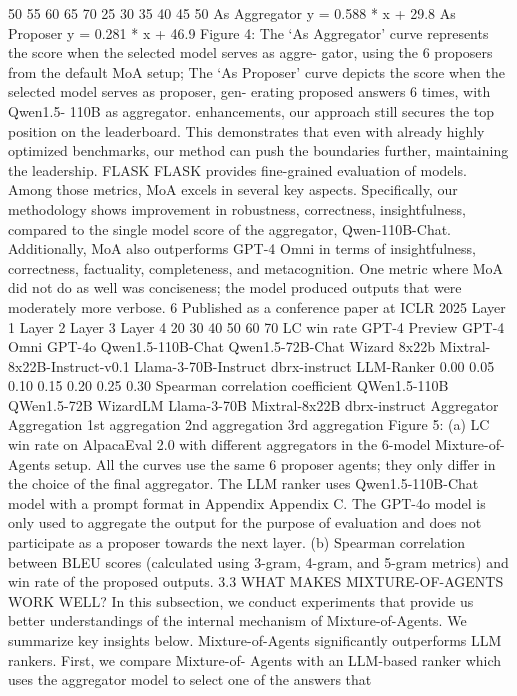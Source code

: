 50
55
60
65
70
25
30
35
40
45
50
As Aggregator
y = 0.588 * x + 29.8
As Proposer
y = 0.281 * x + 46.9
Figure 4: The ‘As Aggregator’ curve represents
the score when the selected model serves as aggre-
gator, using the 6 proposers from the default MoA
setup; The ‘As Proposer’ curve depicts the score
when the selected model serves as proposer, gen-
erating proposed answers 6 times, with Qwen1.5-
110B as aggregator.
enhancements, our approach still secures the top position on the leaderboard. This demonstrates
that even with already highly optimized benchmarks, our method can push the boundaries further,
maintaining the leadership.
FLASK
FLASK provides fine-grained evaluation of models. Among those metrics, MoA excels in
several key aspects. Specifically, our methodology shows improvement in robustness, correctness,
insightfulness, compared to the single model score of the aggregator, Qwen-110B-Chat. Additionally,
MoA also outperforms GPT-4 Omni in terms of insightfulness, correctness, factuality, completeness,
and metacognition. One metric where MoA did not do as well was conciseness; the model produced
outputs that were moderately more verbose.
6
Published as a conference paper at ICLR 2025
Layer 1
Layer 2
Layer 3
Layer 4
20
30
40
50
60
70
LC win rate
GPT-4 Preview
GPT-4 Omni
GPT-4o
Qwen1.5-110B-Chat
Qwen1.5-72B-Chat
Wizard 8x22b
Mixtral-8x22B-Instruct-v0.1
Llama-3-70B-Instruct
dbrx-instruct
LLM-Ranker
0.00
0.05
0.10
0.15
0.20
0.25
0.30
Spearman correlation coefficient
QWen1.5-110B
QWen1.5-72B
WizardLM
Llama-3-70B
Mixtral-8x22B
dbrx-instruct
Aggregator
Aggregation
1st aggregation
2nd aggregation
3rd aggregation
Figure 5: (a) LC win rate on AlpacaEval 2.0 with different aggregators in the 6-model Mixture-of-
Agents setup. All the curves use the same 6 proposer agents; they only differ in the choice of the final
aggregator. The LLM ranker uses Qwen1.5-110B-Chat model with a prompt format in Appendix
Appendix C. The GPT-4o model is only used to aggregate the output for the purpose of evaluation and
does not participate as a proposer towards the next layer. (b) Spearman correlation between BLEU
scores (calculated using 3-gram, 4-gram, and 5-gram metrics) and win rate of the proposed outputs.
3.3
WHAT MAKES MIXTURE-OF-AGENTS WORK WELL?
In this subsection, we conduct experiments that provide us better understandings of the internal
mechanism of Mixture-of-Agents. We summarize key insights below.
Mixture-of-Agents significantly outperforms LLM rankers.
First, we compare Mixture-of-
Agents with an LLM-based ranker which uses the aggregator model to select one of the answers that
